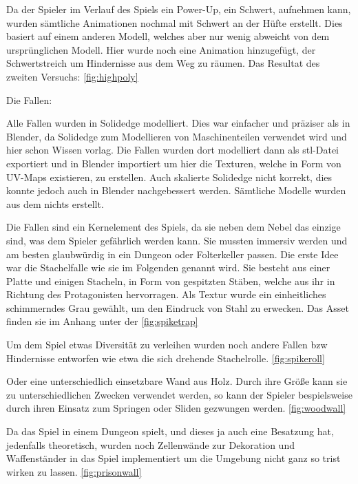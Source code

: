 \documentclass[12pt]{article}
\begin{document}
\noindent Da der Spieler im Verlauf des Spiels ein Power-Up, ein Schwert, aufnehmen kann, wurden sämtliche Animationen nochmal mit Schwert an der Hüfte erstellt. Dies basiert auf
einem anderen Modell, welches aber nur wenig abweicht von dem ursprünglichen Modell. Hier wurde noch eine Animation hinzugefügt, der Schwertstreich um Hindernisse aus dem
Weg zu räumen. Das Resultat des zweiten Versuchs: \ref{fig:highpoly} \newline

Die Fallen:\newline

Alle Fallen wurden in Solidedge modelliert. Dies war einfacher und präziser als in Blender, da Solidedge zum Modellieren von Maschinenteilen verwendet wird und hier schon Wissen vorlag.
Die Fallen wurden dort modelliert dann als stl-Datei exportiert und in Blender importiert um hier die Texturen, welche in Form von UV-Maps existieren, zu erstellen. Auch skalierte Solidedge
nicht korrekt, dies konnte jedoch auch in Blender nachgebessert werden. Sämtliche Modelle wurden aus dem nichts erstellt.\newline

Die Fallen sind ein Kernelement des Spiels, da sie neben dem Nebel das einzige sind, was dem Spieler gefährlich werden kann. Sie mussten immersiv werden und am besten glaubwürdig
in ein Dungeon oder Folterkeller passen. Die erste Idee war die Stachelfalle wie sie im Folgenden genannt wird. Sie besteht aus einer Platte und einigen Stacheln, in Form von gespitzten
Stäben, welche aus ihr in Richtung des Protagonisten hervorragen. Als Textur wurde ein einheitliches schimmerndes Grau gewählt, um den Eindruck von Stahl zu erwecken. Das Asset finden
sie im Anhang unter der \ref{fig:spiketrap}\newline

Um dem Spiel etwas Diversität zu verleihen wurden noch andere Fallen bzw Hindernisse entworfen wie etwa die sich drehende Stachelrolle. \ref{fig:spikeroll}\newline

Oder eine unterschiedlich einsetzbare Wand aus Holz. Durch ihre Größe kann sie zu unterschiedlichen Zwecken verwendet werden, so kann der Spieler bespielsweise durch ihren Einsatz zum 
Springen oder Sliden gezwungen werden. \ref{fig:woodwall}\newline

Da das Spiel in einem Dungeon spielt, und dieses ja auch eine Besatzung hat, jedenfalls theoretisch, wurden noch Zellenwände zur Dekoration und Waffenständer in das Spiel implementiert
um die Umgebung nicht ganz so trist wirken zu lassen. \ref{fig:prisonwall}\newline
\end{document}
